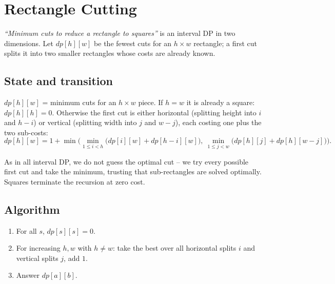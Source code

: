 \section{Rectangle Cutting}
\label{sec:cses-rectangle-cutting}


\begin{patternbox}
\emph{``Minimum cuts to reduce a rectangle to squares''} is an interval
DP in two dimensions. Let $\textit{dp}[h][w]$ be the fewest cuts for an
$h\times w$ rectangle; a first cut splits it into two smaller rectangles
whose costs are already known.
\end{patternbox}

\subsection*{State and transition}

$\textit{dp}[h][w]$ = minimum cuts for an $h\times w$ piece. If $h=w$ it
is already a square: $\textit{dp}[h][h]=0$. Otherwise the first cut is
either horizontal (splitting height into $i$ and $h-i$) or vertical
(splitting width into $j$ and $w-j$), each costing one plus the two
sub-costs:
\[
  \textit{dp}[h][w]=1+\min\!\Big(
  \min_{1\le i<h}\!\big(\textit{dp}[i][w]+\textit{dp}[h-i][w]\big),\
  \min_{1\le j<w}\!\big(\textit{dp}[h][j]+\textit{dp}[h][w-j]\big)\Big).
\]

\begin{ideabox}
As in all interval DP, we do not guess the optimal cut -- we try every
possible first cut and take the minimum, trusting that sub-rectangles are
solved optimally. Squares terminate the recursion at zero cost.
\end{ideabox}

\subsection*{Algorithm}

\begin{enumerate}
  \item For all $s$, $\textit{dp}[s][s]=0$.
  \item For increasing $h,w$ with $h\ne w$: take the best over all
        horizontal splits $i$ and vertical splits $j$, add $1$.
  \item Answer $\textit{dp}[a][b]$.
\end{enumerate}

